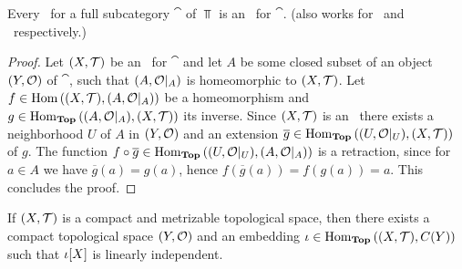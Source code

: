 \begin{theorem} \label{theorem:ane_to_anr}
	Every \ane\ for a full subcategory $\cat$ of $\Top$ is an \anr\ for $\cat$. (also works for \aex\ and \ar\ respectively.)
\end{theorem}
\begin{proof}
	Let $\tspace$ be an \ane\ for $\cat$ and let $A$ be some closed subset of an object $\tspace[Y][O]$ of $\cat$, such that ${\left ( A, \mathcal{O}\vert_A \right )}$ is homeomorphic to $\tspace$. Let $f \in \Hom\pbraces{\tspace, \reltspace[A][O]}$ be a homeomorphism and $g \in \Hom_\Top\pbraces{\reltspace[A][O], \tspace}$ its inverse. Since $\tspace$ is an \ane\, there exists a neighborhood $U$ of $A$ in $\tspace[Y][O]$ and an extension $\overline{g} \in \Hom_\Top\pbraces{\reltspace[U][O], \tspace}$ of $g$. The function $f \circ \overline{g} \in \operatorname{Hom}_{\mathbf{Top}}{\left ( {\left ( U, \mathcal{O}\vert_U \right )}, {\left ( A, \mathcal{O}\vert_A \right )} \right )}$ is a retraction, since for $a \in A$ we have $\overline{g}(a) = g(a)$, hence $f(\overline{g}(a)) = f(g(a)) = a$. This concludes the proof. 
\end{proof}

\begin{lemma}
	If $\tspace$ is a compact and metrizable topological space, then there exists a compact topological space $\tspace[Y][O]$ and an embedding $\iota \in \Hom_\Top\pbraces{\tspace, C(Y)}$ such that $\iota{\left [ X \right ]}$ is linearly independent. 
\end{lemma}

